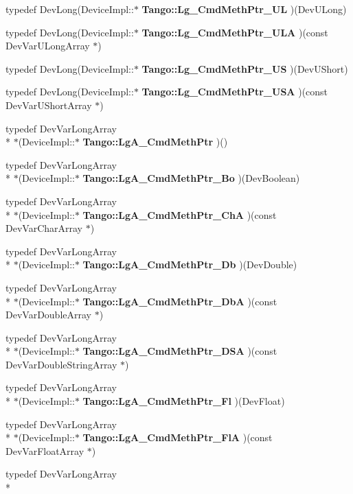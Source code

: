 \begin{DoxyCompactItemize}
typedef Dev\-Long(Device\-Impl\-::$\ast$ {\bf Tango\-::\-Lg\-\_\-\-Cmd\-Meth\-Ptr\-\_\-\-U\-L} )(Dev\-U\-Long)
\item 
typedef Dev\-Long(Device\-Impl\-::$\ast$ {\bf Tango\-::\-Lg\-\_\-\-Cmd\-Meth\-Ptr\-\_\-\-U\-L\-A} )(const Dev\-Var\-U\-Long\-Array $\ast$)
\item 
typedef Dev\-Long(Device\-Impl\-::$\ast$ {\bf Tango\-::\-Lg\-\_\-\-Cmd\-Meth\-Ptr\-\_\-\-U\-S} )(Dev\-U\-Short)
\item 
typedef Dev\-Long(Device\-Impl\-::$\ast$ {\bf Tango\-::\-Lg\-\_\-\-Cmd\-Meth\-Ptr\-\_\-\-U\-S\-A} )(const Dev\-Var\-U\-Short\-Array $\ast$)
\item 
typedef Dev\-Var\-Long\-Array \\*
$\ast$(Device\-Impl\-::$\ast$ {\bf Tango\-::\-Lg\-A\-\_\-\-Cmd\-Meth\-Ptr} )()
\item 
typedef Dev\-Var\-Long\-Array \\*
$\ast$(Device\-Impl\-::$\ast$ {\bf Tango\-::\-Lg\-A\-\_\-\-Cmd\-Meth\-Ptr\-\_\-\-Bo} )(Dev\-Boolean)
\item 
typedef Dev\-Var\-Long\-Array \\*
$\ast$(Device\-Impl\-::$\ast$ {\bf Tango\-::\-Lg\-A\-\_\-\-Cmd\-Meth\-Ptr\-\_\-\-Ch\-A} )(const Dev\-Var\-Char\-Array $\ast$)
\item 
typedef Dev\-Var\-Long\-Array \\*
$\ast$(Device\-Impl\-::$\ast$ {\bf Tango\-::\-Lg\-A\-\_\-\-Cmd\-Meth\-Ptr\-\_\-\-Db} )(Dev\-Double)
\item 
typedef Dev\-Var\-Long\-Array \\*
$\ast$(Device\-Impl\-::$\ast$ {\bf Tango\-::\-Lg\-A\-\_\-\-Cmd\-Meth\-Ptr\-\_\-\-Db\-A} )(const Dev\-Var\-Double\-Array $\ast$)
\item 
typedef Dev\-Var\-Long\-Array \\*
$\ast$(Device\-Impl\-::$\ast$ {\bf Tango\-::\-Lg\-A\-\_\-\-Cmd\-Meth\-Ptr\-\_\-\-D\-S\-A} )(const Dev\-Var\-Double\-String\-Array $\ast$)
\item 
typedef Dev\-Var\-Long\-Array \\*
$\ast$(Device\-Impl\-::$\ast$ {\bf Tango\-::\-Lg\-A\-\_\-\-Cmd\-Meth\-Ptr\-\_\-\-Fl} )(Dev\-Float)
\item 
typedef Dev\-Var\-Long\-Array \\*
$\ast$(Device\-Impl\-::$\ast$ {\bf Tango\-::\-Lg\-A\-\_\-\-Cmd\-Meth\-Ptr\-\_\-\-Fl\-A} )(const Dev\-Var\-Float\-Array $\ast$)
\item 
typedef Dev\-Var\-Long\-Array \\*

\end{DoxyCompactItemize}

